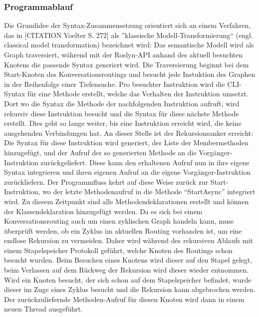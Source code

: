 \subsubsection{Programmablauf}
Die Grundidee der Syntax-Zusammensetzung orientiert sich an einem Verfahren, das in [CITATION Voelter S. 272] als ''klassische Modell-Transformierung`` (engl. classical model transformation) bezeichnet wird: Das semantische Modell wird als Graph traversiert, während mit der Roslyn-API anhand des aktuell besuchten Knotens die passende Syntax generiert wird. Die Traversierung beginnt bei dem Start-Knoten des Konversationsroutings und besucht jede Instuktion des Graphen in der Reihenfolge einer Tiefensuche. Pro besuchter Instruktion wird die CLI-Syntax für eine Methode erstellt, welche das Verhalten der Instruktion umsetzt. Dort wo die Syntax die Methode der nachfolgenden Instruktion aufruft, wird rekursiv diese Instruktion besucht und die Syntax für diese nächste Methode erstellt. Dies geht so lange weiter, bis eine Instruktion erreicht wird, die keine ausgehenden Verbindungen hat. An dieser Stelle ist der Rekursionsanker erreicht: Die Syntax für diese Instruktion wird generiert, der Liste der Membermethoden hinzugefügt, und der Aufruf der so generierten Methode an die Vorgänger-Instruktion zurückgeliefert. Diese kann den erhaltenen Aufruf nun in ihre eigene Syntax integrieren und ihren eigenen Aufruf an die eigene Vorgänger-Instruktion zurückliefern. Der Programmfluss kehrt auf diese Weise zurück zur Start-Instruktion, wo der letzte Methodenaufruf in die Methode ``StartAsync'' integriert wird. Zu diesem Zeitpunkt sind alle Methodendeklarationen erstellt und können der Klassendeklaration hinzugefügt werden.
\newline
Da es sich bei einem Konversationsrouting auch um einen zyklischen Graph handeln kann, muss überprüft werden, ob ein Zyklus im aktuellen Routing vorhanden ist, um eine endlose Rekursion zu vermeiden. Daher wird während des rekursiven Ablaufs mit einem Stapelspeicher Protokoll geführt, welche Knoten des Routings schon besucht wurden. Beim Besuchen eines Knotens wird dieser auf den Stapel gelegt, beim Verlassen auf dem Rückweg der Rekursion wird dieser wieder entnommen. Wird ein Knoten besucht, der sich schon auf dem Stapelspeicher befindet, wurde dieser im Zuge eines Zyklus besucht und die Rekursion kann abgebrochen werden. Der zurückzuliefernde Methoden-Aufruf für diesen Knoten wird dann in einem neuen Thread ausgeführt. 
\newline
